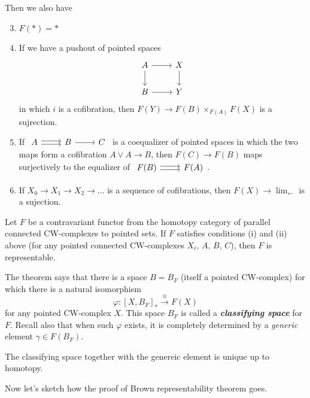 Then we also have
\begin{enumerate}[label=(\roman*)]\setcounter{enumi}{2}
	\item $F(*)=*$
	\item If we have a pushout of pointed spaces
		\[\begin{tikzcd}
			A\arrow[r]\arrow[d]&X\arrow[d]\\
			B\arrow[r]&Y
		\end{tikzcd}\]
		in which $i$ is a cofibration, then  $F(Y)\to F(B)\times_{F(A)}F(X)$ is a sujrection.
	\item If $\begin{tikzcd}A\arrow[r,shift={(0,0.07)}]\arrow[r,shift={(0,-0.07)}]&B\arrow[r]&C\end{tikzcd}$ is a coequalizer of pointed spaces in which the two maps form a cofibration $A\vee A\to B$, then $F(C)\to F(B)$ maps surjectively to the equalizer of $\begin{tikzcd}F(B)\arrow[r,shift={(0,0.07)}]\arrow[r,shift={(0,-0.07)}]&F(A)\end{tikzcd}$.
	\item If $X_{0}\to X_{1}\to X_{2}\to \ldots$ is a sequence of cofibrations, then $F(X)\to \lim_{\leftarrow}$ is a sujection.
\end{enumerate}

\begin{thm}
	Let $F$ be a contravariant functor from the homotopy category of parallel connected CW-complexes to pointed sets. If $F$ satisfies conditions (i) and (ii) above (for any pointed connected CW-complexes $X_{i}$, $A$, $B$, $C$), then $F$ is representable.
\end{thm}

\begin{remark}
	The theorem says that there is a space $B=B_{F}$ (itself a pointed CW-complex) for which there is a natural isomorphism
	\[\varphi :[X,B_{F}]_{*}\overset{\cong }{\longrightarrow}F(X)\]
	for any pointed CW-complex $X$. This space $B_{F}$ is called a \textit{\textbf{classifying space}} for $F$. Recall also that when such $\varphi$ exists, it is completely determined by a \textit{generic} element $\gamma\in F(B_{F})$.

	The classifying space together with the genereic element is unique up to homotopy.
\end{remark}

Now let's sketch how the proof of Brown representability theorem goes.

